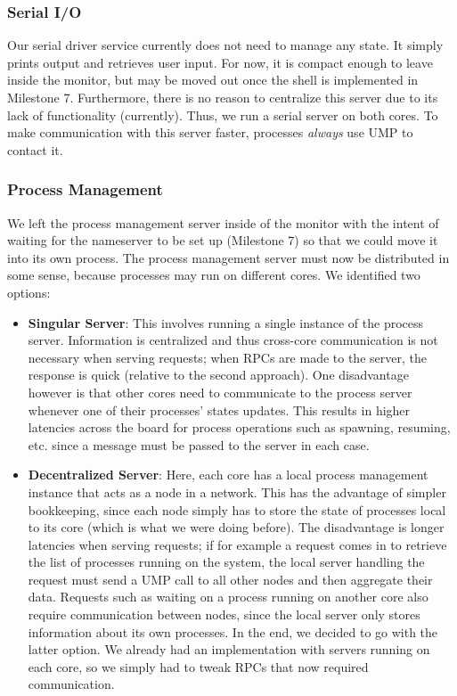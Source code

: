 \subsubsection{Serial I/O}
Our serial driver service currently does not need to manage any state. It simply prints output and retrieves user input. For now, it is compact enough to leave inside the monitor, but may be moved out once the shell is implemented in Milestone 7. Furthermore, there is no reason to centralize this server due to its lack of functionality (currently). Thus, we run a serial server on both cores. To make communication with this server faster, processes \textit{always} use UMP to contact it.

\subsubsection{Process Management}
We left the process management server inside of the monitor with the intent of waiting for the nameserver to be set up (Milestone 7) so that we could move it into its own process. The process management server must now be distributed in some sense, because processes may run on different cores. We identified two options:
\begin{itemize}[itemsep=0pt]
    \item \textbf{Singular Server}: This involves running a single instance of the process server. Information is centralized and thus cross-core communication is not necessary when serving requests; when RPCs are made to the server, the response is quick (relative to the second approach). One disadvantage however is that other cores need to communicate to the process server whenever one of their processes' states updates. This results in higher latencies across the board for process operations such as spawning, resuming, etc. since a message must be passed to the server in each case.
    \item \textbf{Decentralized Server}: Here, each core has a local process management instance that acts as a node in a network. This has the advantage of simpler bookkeeping, since each node simply has to store the state of processes local to its core (which is what we were doing before). The disadvantage is longer latencies when serving requests; if for example a request comes in to retrieve the list of processes running on the system, the local server handling the request must send a UMP call to all other nodes and then aggregate their data. Requests such as waiting on a process running on another core also require communication between nodes, since the local server only stores information about its own processes. In the end, we decided to go with the latter option. We already had an implementation with servers running on each core, so we simply had to tweak RPCs that now required communication.
\end{itemize}
